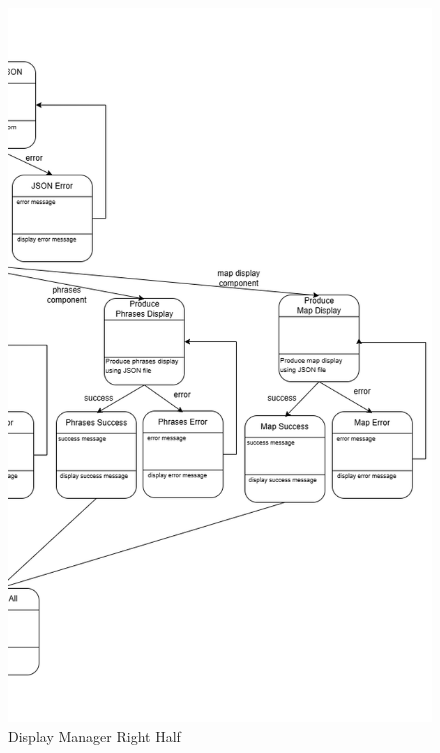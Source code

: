 \begin{figure}[H]
	\centering
	\includegraphics[width=\textwidth, height=0.95\textheight, keepaspectratio]{Section2/images/display_manager_state_diagram_right_half.png}
	\caption{Display Manager Right Half}
	\label{DisplayManager}
\end{figure}
